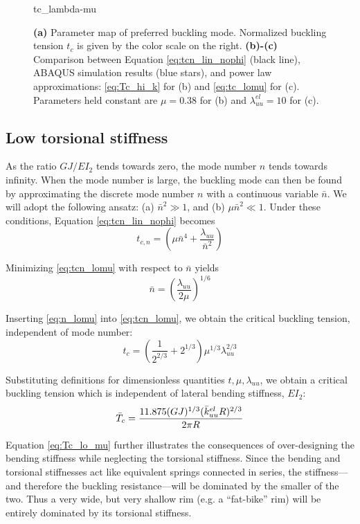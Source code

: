 \documentclass[\rootdir/thesis.tex]{subfiles}
\begin{document}
\begin{figure}[h]
\centering
{tc_lambda-mu}
\caption{\textbf{(a)} Parameter map of preferred buckling mode. Normalized buckling tension $t_c$ is given by the color scale on the right. \textbf{(b)-(c)} Comparison between Equation \eqref{eq:tcn_lin_nophi} (black line), ABAQUS simulation results (blue stars), and power law approximations: \eqref{eq:Tc_hi_k} for (b) and \eqref{eq:tc_lomu} for (c). Parameters held constant are $\mu=0.38$ for (b) and $\lambda_{uu}^{el}=10$ for (c).}
\label{fig:tc_lambda_mu}
\end{figure}

\subsection{Low torsional stiffness}
As the ratio $GJ/EI_2$ tends towards zero, the mode number $n$ tends towards infinity. When the mode number is large, the buckling mode can then be found by approximating the discrete mode number $n$ with a continuous variable $\bar{n}$. We will adopt the following ansatz: (a) $\bar{n}^2 \gg 1$, and (b) $\mu\bar{n}^2 \ll 1$. Under these conditions, Equation \eqref{eq:tcn_lin_nophi} becomes
\begin{equation}
\label{eq:tcn_lomu}
t_{c,n} = \left(\mu \bar{n}^4 + \frac{\lambda_{uu}}{\bar{n}^2}\right)
\end{equation}

Minimizing \eqref{eq:tcn_lomu} with respect to $\bar{n}$ yields
\begin{equation}
\label{eq:n_lomu}
\bar{n}=\left(\frac{\lambda_{uu}}{2\mu}\right)^{1/6}
\end{equation}

Inserting \eqref{eq:n_lomu} into \eqref{eq:tcn_lomu}, we obtain the critical buckling tension, independent of mode number:
\begin{equation}
\label{eq:tc_lomu}
t_c = \left(\frac{1}{2^{2/3}} + 2^{1/3}\right)\mu^{1/3}\lambda_{uu}^{2/3}
\end{equation}

Substituting definitions for dimensionless quantities $t,\mu,\lambda_{uu}$, we obtain a critical buckling tension which is independent of lateral bending stiffness, $EI_2$:
\begin{equation}
\label{eq:Tc_lo_mu}
\bar{T}_c = \frac{11.875 (GJ)^{1/3} (\bar{k}_{uu}^{el}R)^{2/3}}{2\pi R}
\end{equation}

Equation \eqref{eq:Tc_lo_mu} further illustrates the consequences of over-designing the bending stiffness while neglecting the torsional stiffness. Since the bending and torsional stiffnesses act like equivalent springs connected in series, the stiffness---and therefore the buckling resistance---will be dominated by the smaller of the two. Thus a very wide, but very shallow rim (e.g. a ``fat-bike'' rim) will be entirely dominated by its torsional stiffness.
\end{document}
